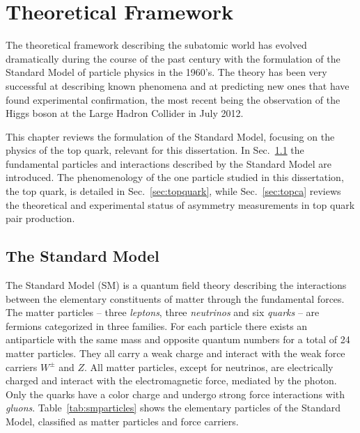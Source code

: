 \chapter{Theoretical Framework}
\label{sec:theory}

The theoretical framework describing the subatomic world has
evolved dramatically during the course of the past century with the
formulation of the Standard Model of particle physics in the
1960's. The theory has been very successful at describing known
phenomena and at predicting new ones that have found experimental
confirmation, the most recent being the observation of the Higgs boson
at the Large Hadron Collider in July 2012.

This chapter reviews the formulation of the Standard Model, focusing
on the physics of the top quark, relevant for this dissertation. In
Sec.~\ref{sec:theSM} the fundamental particles and interactions
described by the Standard Model are introduced. The phenomenology of
the one particle studied in this dissertation, the top quark, is
detailed in Sec.~\ref{sec:topquark}, while Sec.~\ref{sec:topca}
reviews the theoretical and experimental status of asymmetry measurements
in top quark pair production.


\section{The Standard Model}
\label{sec:theSM}

The Standard Model (SM) is a quantum field theory describing the
interactions between the elementary constituents of matter through the
fundamental forces.
The matter particles -- three {\it leptons}, three {\it neutrinos} and six
{\it quarks} -- are fermions categorized in three families. For each particle
there exists an antiparticle with the same mass and opposite quantum
numbers for a total of 24 matter particles.
They all carry a weak charge and interact with
the weak force carriers $W^{\pm}$ and $Z$. All matter particles, except for
neutrinos, are electrically charged and interact with the
electromagnetic force, mediated by the photon. Only the quarks have a
color charge and undergo strong force interactions with {\it gluons}.  
Table~\ref{tab:smparticles} shows the elementary particles of the
Standard Model, classified as matter particles and force carriers.

